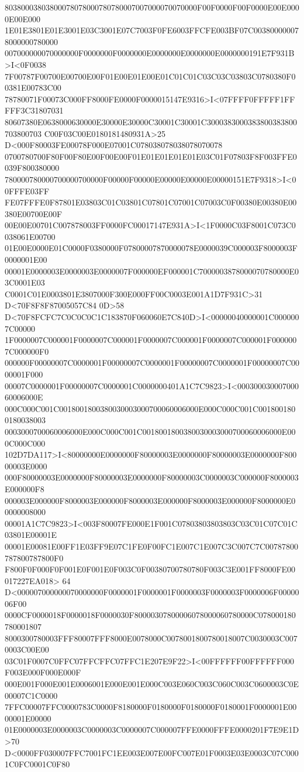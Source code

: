 80380003803800078078000780780007007000070070000F00F0000F00F0000E00E0000E00E000
1E01E3801E01E3001E03C3001E07C7003F0FE6003FFCFE003BF07C003800000078000000780000
007000000070000000F0000000F0000000E0000000E0000000E0000000191E7F931B>I<0F0038
7F00787F00700E00700E00F01E00E01E00E01C01C01C03C03C03803C0780380F00381E00783C00
78780071F00073C000FF8000FE0000F0000015147E9316>I<07FFFF0FFFFF1FFFFF3C31807031
80607380E0638000630000E30000E30000C30001C30001C3000383000383800383800703800703
C00F03C00E0180181480931A>25 D<000F80003FE00078F000E07001C078038078038078070078
0700780700F80F00F80E00F00E00F01E01E01E01E01E03C01F07803F8F003FFE0039F800380000
780000780000700000700000F00000F00000E00000E00000E00000151E7F9318>I<00FFFE03FF
FE07FFFE0F87801E03803C01C03801C07801C07001C07003C0F00380E00380E00380E00700E00F
00E00E00701C007878003FF0000FC00017147E931A>I<1F0000C03F8001C073C0038061E00700
01E00E0000E01C0000F0380000F07800007870000078E0000039C000003F8000003F0000001E00
00001E0000003E0000003E0000007F000000EF000001C7000003878000070780000E03C0001E03
C0001C01E0003801E3807000F300E000FF00C0003E001A1D7F931C>31 D<70F8F8F87005057C84
0D>58 D<70F8FCFC7C0C0C0C1C183870F060060E7C840D>I<00000040000001C0000007C00000
1F0000007C000001F0000007C000001F0000007C000001F0000007C000001F0000007C000000F0
000000F00000007C0000001F00000007C0000001F00000007C0000001F00000007C0000001F000
00007C0000001F00000007C0000001C0000000401A1C7C9823>I<00030003000700060006000E
000C000C001C0018001800380030003000700060006000E000C000C001C0018001800180038003
0003000700060006000E000C000C001C0018001800380030003000700060006000E000C000C000
102D7DA117>I<80000000E0000000F80000003E0000000F80000003E0000000F80000003E0000
000F80000003E0000000F80000003E0000000F80000003C0000003C000000F8000003E000000F8
000003E000000F8000003E000000F8000003E000000F8000003E000000F8000000E00000008000
00001A1C7C9823>I<003F80007FE000E1F001C07803803803803C03C01C07C01C03801E00001E
00001E00081E00FF1E03FF9E07C1FE0F00FC1E007C1E007C3C007C7C00787800787800787800F0
F800F0F000F0F001E0F001E0F003C0F00380700780780F003C3E001FF8000FE00017227EA018>
64 D<000007000000070000000F0000001F0000001F0000003F0000003F0000006F0000006F00
0000CF0000018F0000018F0000030F80000307800006078000060780000C078000180780001807
8000300780003FFF80007FFF8000E0078000C0078001800780018007C0030003C0070003C00E00
03C01F0007C0FFC07FFCFFC07FFC1E207E9F22>I<00FFFFFF00FFFFFF000F003E000F000E000F
000E001F000E001E0006001E000E001E000C003E060C003C060C003C0600003C0E00007C1C0000
7FFC00007FFC0000783C0000F8180000F0180000F0180000F0180001F0000001E0000001E00000
01E0000003E0000003C0000003C0000007C000007FFE0000FFFE0000201F7E9E1D>70
D<0000FF030007FFC7001FC1EE003E007E00FC007E01F0003E03E0003C07C0001C0FC0001C0F80
